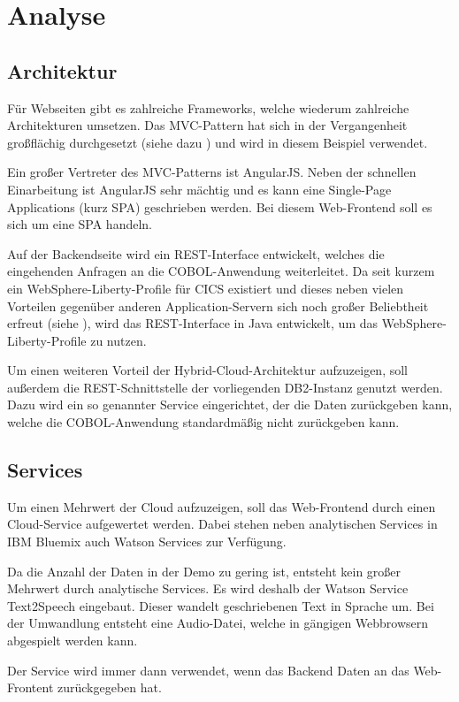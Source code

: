 \section{Analyse}

\subsection{Architektur}
Für Webseiten gibt es zahlreiche Frameworks, welche wiederum zahlreiche Architekturen umsetzen. Das MVC-Pattern hat sich
in der Vergangenheit großflächig durchgesetzt (siehe dazu \cite{book_prototypischeanwendung_mvc}) und wird in diesem Beispiel
verwendet.

Ein großer Vertreter des MVC-Patterns ist AngularJS. Neben der schnellen Einarbeitung ist AngularJS sehr mächtig und es
kann eine Single-Page Applications (kurz SPA) geschrieben werden. Bei diesem Web-Frontend soll es sich um eine SPA handeln.

Auf der Backendseite wird ein REST-Interface entwickelt, welches die eingehenden Anfragen an die COBOL-Anwendung weiterleitet.
Da seit kurzem ein WebSphere-Liberty-Profile für CICS existiert und dieses neben vielen Vorteilen gegenüber anderen
Application-Servern sich noch großer Beliebtheit erfreut (siehe \cite{online_prototypischeanwendung_cicsliberty}),
wird das REST-Interface in Java entwickelt, um das WebSphere-Liberty-Profile zu nutzen.

Um einen weiteren Vorteil der Hybrid-Cloud-Architektur aufzuzeigen, soll außerdem die REST-Schnittstelle der vorliegenden
DB2-Instanz genutzt werden. Dazu wird ein so genannter Service eingerichtet, der die Daten zurückgeben kann, welche die
COBOL-\-Anwendung standardmäßig nicht zurückgeben kann.

\subsection{Services}
Um einen Mehrwert der Cloud aufzuzeigen, soll das Web-Frontend durch einen Cloud-Service aufgewertet werden. Dabei stehen
neben analytischen Services in IBM Bluemix auch Watson Services zur Verfügung.

Da die Anzahl der Daten in der Demo zu gering ist, entsteht kein großer Mehrwert durch analytische Services. Es wird
deshalb der Watson Service Text2Speech eingebaut. Dieser wandelt geschriebenen Text in Sprache um. Bei der Umwandlung
entsteht eine Audio-Datei, welche in gängigen Webbrowsern abgespielt werden kann.

Der Service wird immer dann verwendet, wenn das Backend Daten an das Web-Frontent zurückgegeben hat.


